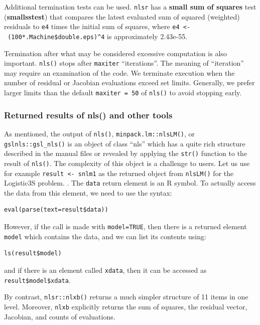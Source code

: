 Additional termination tests can be used. \texttt{nlsr} has a \textbf{small sum of
squares} test (\textbf{smallsstest}) that compares the latest evaluated sum of squared
(weighted) residuals to \texttt{e4} times the initial sum of squares, where
\texttt{e4\ \textless{}-\ (100*.Machine\$double.eps)\^{}4} is approximately 2.43e-55.

Termination after what may be considered excessive computation is also important.
\texttt{nls()} stops after \texttt{maxiter} ``iterations''. The meaning of ``iteration'' may require an
examination of the code. We terminate execution when the number of residual or
Jacobian evaluations exceed set limits. Generally, we prefer larger limits than the
default \texttt{maxiter\ =\ 50} of \texttt{nls()} to avoid stopping early.

\subsubsection{Returned results of nls() and other tools}\label{returned-results-of-nls-and-other-tools}

As mentioned, the output of \texttt{nls()}, \texttt{minpack.lm::nlsLM()}, or
\texttt{gslnls::gsl\_nls()} is an object of class ``nls'' which has a quite rich structure
described in the manual files or revealed by applying the \texttt{str()} function to the
result of \texttt{nls()}. The complexity of this object is a challenge to users. Let us
use for example \texttt{result\ \textless{}-\ snlm1} as the returned object from \texttt{nlsLM()} for the
Logistic3S problem. . The \texttt{data} return element
is an R symbol. To actually access the data from this element, we need to use
the syntax:

\begin{verbatim}
eval(parse(text=result$data))
\end{verbatim}

However, if the call is made with \texttt{model=TRUE}, then there is a returned element
\texttt{model} which contains the data, and we can list its contents using:

\begin{verbatim}
ls(result$model)
\end{verbatim}

and if there is an element called \texttt{xdata}, then it can be accessed as
\texttt{result\$model\$xdata}.

By contrast, \texttt{nlsr::nlxb()} returns a much simpler structure of 11 items
in one level. Moreover, \texttt{nlxb} explicitly returns the sum of squares, the residual vector, Jacobian, and counts of evaluations.

